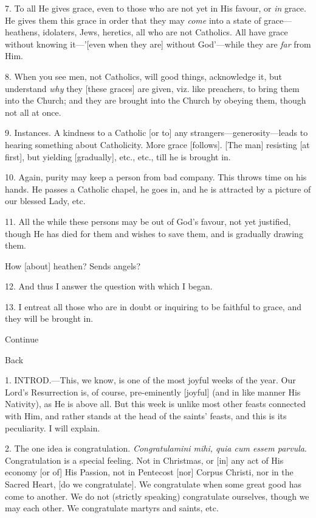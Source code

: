 7. To all He gives grace, even to those who are
not yet in His favour, or \emph{in} grace. He gives them this grace in
order that they may \emph{come} into a state of grace—heathens,
idolaters, Jews, heretics, all who are not Catholics. All have grace
without knowing it—'[even when they are] without God'—while they
are \emph{far} from Him.

8. When you see men, not Catholics, will good
things, acknowledge it, but understand \emph{why} they [these graces]
are given, viz. like preachers, to bring them into the Church; and
they are brought into the Church by obeying them, though not all at
once.

9. Instances. A kindness to a Catholic [or to]
any strangers—generosity—leads to hearing something about
Catholicity. More grace [follows]. [The man] resisting [at first], but
yielding [gradually], etc., etc., till he is brought in.

10. Again, purity may keep a person from bad
company. This throws time on his hands. He passes a Catholic chapel,
he goes in, and he is attracted by a picture of our blessed Lady, etc.

11. All the while these persons may be out of God's
favour, not yet justified, though He has died for them and wishes to
save them, and is gradually drawing them.

How [about] heathen? Sends angels?

12. And thus I answer the question with which I
began.

13. I entreat all those who are in doubt or
inquiring to be faithful to grace, and they will be brought in.

Continue

Back


1. INTROD.—This,
we know, is one of the most joyful weeks of the year. Our Lord's
Resurrection is, of course, pre-eminently [joyful] (and in like manner His Nativity), as He is above all. But this week is unlike most
other feasts connected with Him, and rather stands at the head of the
saints' feasts, and this is its peculiarity. I will explain.

2. The one idea is congratulation. \emph{Congratulamini
mihi, quia cum essem parvula}. Congratulation is a special feeling.
Not in Christmas, or [in] any act of His economy [or of] His Passion,
not in Pentecost [nor] Corpus Christi, nor in the Sacred Heart, [do we
congratulate]. We congratulate when some great good has come to
another. We do not (strictly speaking) congratulate ourselves, though
we may each other. We congratulate martyrs and saints, etc.

